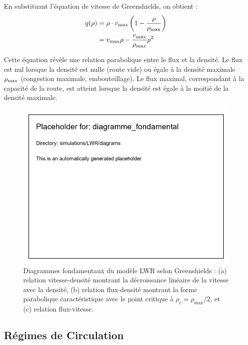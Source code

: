 En substituant l'équation de vitesse de Greenshields, on obtient :
\begin{align}
q(\rho) &= \rho \cdot v_{\text{max}} \left(1 - \frac{\rho}{\rho_{\text{max}}}\right) \notag \\
&= v_{\text{max}} \rho - \frac{v_{\text{max}}}{\rho_{\text{max}}} \rho^2
\label{eq:greenshields_flux}
\end{align}

Cette équation révèle une relation parabolique entre le flux et la densité. Le flux est nul lorsque la densité est nulle (route vide) ou égale à la densité maximale $\rho_{\text{max}}$ (congestion maximale, embouteillage). Le flux maximal, correspondant à la capacité de la route, est atteint lorsque la densité est égale à la moitié de la densité maximale.

\begin{figure}[htbp]
\centering
\includegraphics[width=1.0\textwidth]{simulations/LWR/diagrams/diagramme_fondamental}
\caption{Diagrammes fondamentaux du modèle LWR selon Greenshields : (a) relation vitesse-densité montrant la décroissance linéaire de la vitesse avec la densité, (b) relation flux-densité montrant la forme parabolique caractéristique avec le point critique à $\rho_c = \rho_{\max}/2$, et (c) relation flux-vitesse.}
\label{fig:diagramme_fondamental}
\end{figure}

\subsection{Régimes de Circulation}
\label{subsec:regimes}

